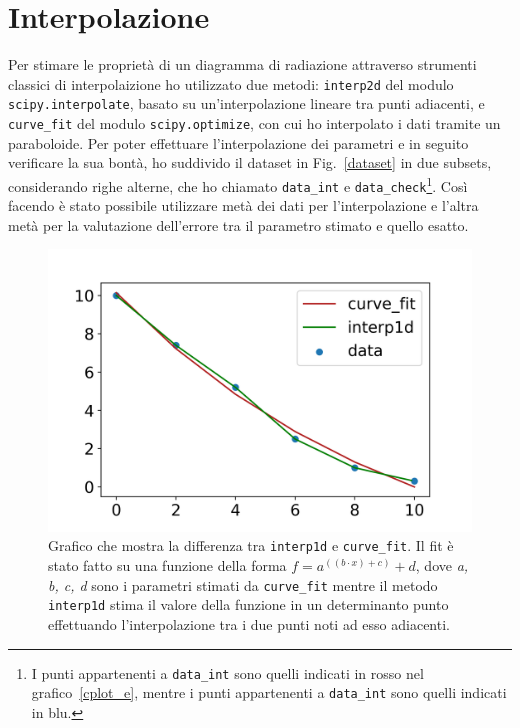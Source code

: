 \documentclass[12pt,a4paper,final]{book}
\begin{document}
\section{Interpolazione}\label{interpolazione}
Per stimare le proprietà di un diagramma di radiazione attraverso strumenti classici di interpolaizione ho utilizzato due metodi: \texttt{interp2d} del modulo \texttt{scipy.interpolate}, basato su un'interpolazione lineare tra punti adiacenti, e \texttt{curve\_fit} del modulo \texttt{scipy.optimize}, con cui ho interpolato i dati tramite un paraboloide.
Per poter effettuare l'interpolazione dei parametri e in seguito verificare la sua bontà, ho suddivido il dataset in Fig.~\ref{dataset} in due subsets, considerando righe alterne, che ho chiamato \texttt{data\_int} e \texttt{data\_check}\footnote{I punti appartenenti a \texttt{data\_int} sono quelli indicati in rosso nel grafico~\ref{cplot_e}, mentre i punti appartenenti a \texttt{data\_int} sono quelli indicati in blu.}. Così facendo è stato possibile utilizzare metà dei dati per l'interpolazione e l'altra metà per la valutazione dell'errore tra il parametro stimato e quello esatto.

\begin{figure}[!ht]
	\centering
	\includegraphics[scale=0.8]{../figures/EsempioInterpolazione.png}
	\caption{Grafico che mostra la differenza tra \texttt{interp1d} e \texttt{curve\_fit}. Il fit è stato fatto su una funzione della forma $f=a^{((b\cdot x)+c)}+d$, dove \textit{a, b, c, d} sono i parametri stimati da \texttt{curve\_fit} mentre il metodo \texttt{interp1d} stima il valore della funzione in un determinanto punto effettuando l'interpolazione tra i due punti noti ad esso adiacenti.}
	\label{es_interp}
\end{figure}
\end{document}
